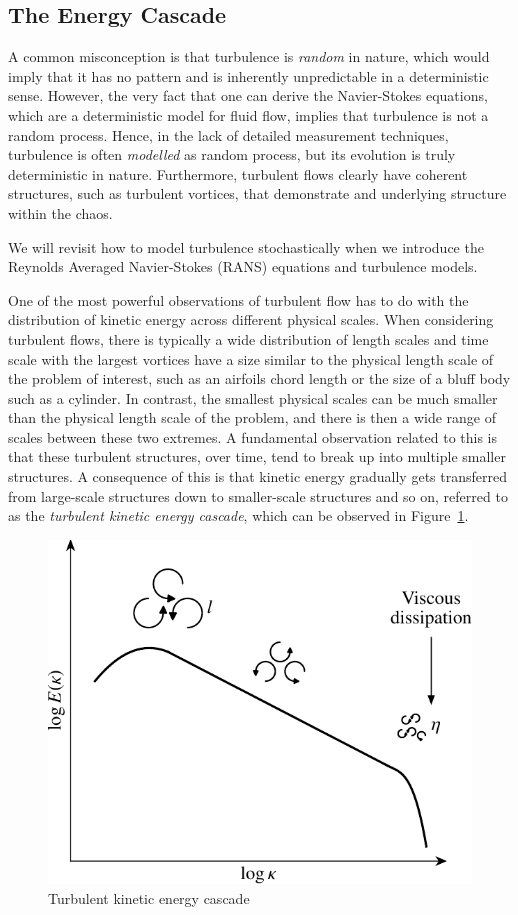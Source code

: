 \subsection{The Energy Cascade}
A common misconception is that turbulence is {\it random} in nature, which would imply that it has no pattern and is inherently unpredictable in a deterministic sense. However, the very fact that one can derive the Navier-Stokes equations, which are a deterministic model for fluid flow, implies that turbulence is not a random process. Hence, in the lack of detailed measurement techniques, turbulence is often {\it modelled} as random process, but its evolution is truly deterministic in nature. Furthermore, turbulent flows clearly have coherent structures, such as turbulent vortices, that demonstrate and underlying structure within the chaos.
\begin{remark}
We will revisit how to model turbulence stochastically when we introduce the Reynolds Averaged Navier-Stokes (RANS) equations and turbulence models.
\end{remark}

One of the most powerful observations of turbulent flow has to do with the distribution of kinetic energy across different physical scales. When considering turbulent flows, there is typically a wide distribution of length scales and time scale with the largest vortices have a size similar to the physical length scale of the problem of interest, such as an airfoils chord length or the size of a bluff body such as a cylinder. In contrast, the smallest physical scales can be much smaller than the physical length scale of the problem, and there is then a wide range of scales between these two extremes. A fundamental observation related to this is that these turbulent structures, over time, tend to break up into multiple smaller structures. A consequence of this is that kinetic energy gradually gets transferred from large-scale structures down to smaller-scale structures and so on, referred to as the {\it turbulent kinetic energy cascade}, which can be observed in Figure~\ref{fig:energy_cascade}.
\begin{figure}[tbp]
	\centering
	\includegraphics[width=0.5\linewidth]{Pictures/energy_cascade}
	\caption{Turbulent kinetic energy cascade}
	\label{fig:energy_cascade}
\end{figure}

